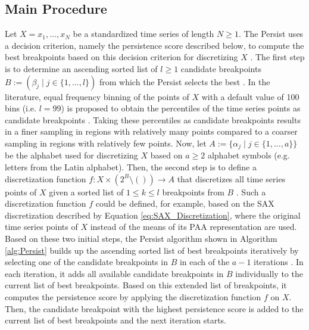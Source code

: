 \subsection*{Main Procedure}
Let $X = x_1, ..., x_N$ be a standardized time series of length $N \geq 1$. The Persist uses a decision criterion, namely the persistence score described below, to compute the best breakpoints based on this decision criterion for discretizing $X$ \cite{Persist}. \newline
The first step is to determine an ascending sorted list of $l \geq 1$ candidate breakpoints $B := (\beta_j \mid j \in \{1, ..., l\})$ from which the Persist selects the best \cite{Persist}. In the literature, equal frequency binning of the points of $X$ with a default value of 100 bins (i.e. $l = 99$) is proposed to obtain the percentiles of the time series points as candidate breakpoints \cite{Persist}. Taking these percentiles as candidate breakpoints results in a finer sampling in regions with relatively many points compared to a coarser sampling in regions with relatively few points. \newline
Now, let $A := \{\alpha_j \mid j \in \{1, ..., a\}\}$ be the alphabet used for discretizing $X$ based on $a \geq 2$ alphabet symbols (e.g. letters from the Latin alphabet). Then, the second step is to define a discretization function $f: X \times (2^B \setminus ()) \rightarrow A$ that discretizes all time series points of $X$ given a sorted list of $1 \leq k \leq l$ breakpoints from $B$ \cite{Persist}. Such a discretization function $f$ could be defined, for example, based on the \ac{SAX} discretization described by Equation \ref{eq:SAX_Discretization}, where the original time series points of $X$ instead of the means of its \ac{PAA} representation are used. \newline
Based on these two initial steps, the Persist algorithm shown in Algorithm \ref{alg:Persist} builds up the ascending sorted list of best breakpoints iteratively by selecting one of the candidate breakpoints in $B$ in each of the $a-1$ iterations \cite{Persist}. In each iteration, it adds all available candidate breakpoints in $B$ individually to the current list of best breakpoints. Based on this extended list of breakpoints, it computes the persistence score by applying the discretization function $f$ on $X$. Then, the candidate breakpoint with the highest persistence score is added to the current list of best breakpoints and the next iteration starts.
